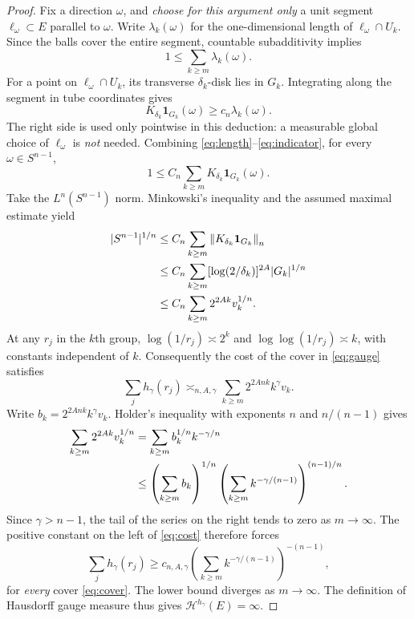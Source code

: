 \documentclass[11pt,a4paper]{article}
\numberwithin{equation}{section}
\theoremstyle{definition}
\theoremstyle{remark}
\newcommand{\one}{\mathbf 1}
\newcommand{\Hs}{\mathcal H}
\newcommand{\Sph}{S^{n-1}}
\begin{document}
\begin{proof}
Fix a direction $\omega$, and \emph{choose for this argument only}
a unit segment $\ell_\omega\subset E$ parallel to $\omega$.
Write $\lambda_k(\omega)$ for the one-dimensional length of
$\ell_\omega\cap U_k$. Since the balls cover the entire segment,
countable subadditivity implies
\begin{equation}\label{eq:length}
 1\le\sum_{k\ge m}\lambda_k(\omega).
\end{equation}
For a point on $\ell_\omega\cap U_k$, its transverse
$\delta_k$-disk lies in $G_k$. Integrating along the segment in
tube coordinates gives
\begin{equation}\label{eq:indicator}
 K_{\delta_k}\one_{G_k}(\omega)
          \ge c_n\lambda_k(\omega).
\end{equation}
The right side is used only pointwise in this deduction: a
measurable global choice of $\ell_\omega$ is \emph{not} needed.
Combining \eqref{eq:length}--\eqref{eq:indicator}, for every
$\omega\in\Sph$,
\begin{equation}\label{eq:pointwise}
 1\le C_n\sum_{k\ge m}K_{\delta_k}\one_{G_k}(\omega).
\end{equation}
Take the $L^n(\Sph)$ norm. Minkowski's inequality and the assumed
maximal estimate yield
\begin{align}
 |\Sph|^{1/n}
 &\le C_n\sum_{k\ge m}\left\|K_{\delta_k}
                                      \one_{G_k}\right\|_n\notag\\
 &\le C_n\sum_{k\ge m}
      [\log(2/\delta_k)]^{2A}|G_k|^{1/n}\notag\\
 &\le C_n\sum_{k\ge m}2^{2Ak}v_k^{1/n}.
 \label{eq:cost}
\end{align}
At any $r_j$ in the $k$th group,
$\log(1/r_j)\asymp2^k$ and
$\log\log(1/r_j)\asymp k$, with constants independent of $k$.
Consequently the cost of the cover in \eqref{eq:gauge} satisfies
\begin{equation}\label{eq:costcompare}
 \sum_jh_\gamma(r_j)
     \asymp_{n,A,\gamma}\sum_{k\ge m}
                             2^{2Ank}k^{\gamma}v_k.
\end{equation}
Write $b_k=2^{2Ank}k^\gamma v_k$. Holder's inequality with
exponents $n$ and $n/(n-1)$ gives
\begin{align}
 \sum_{k\ge m}2^{2Ak}v_k^{1/n}
 &=\sum_{k\ge m}b_k^{1/n}k^{-\gamma/n}\notag\\
 &\le\left(\sum_{k\ge m}b_k\right)^{1/n}
       \left(\sum_{k\ge m}k^{-\gamma/(n-1)}\right)^{(n-1)/n}.
 \label{eq:holder}
\end{align}
Since $\gamma>n-1$, the tail of the series on the right tends to
zero as $m\to\infty$. The positive constant on the left of
\eqref{eq:cost} therefore forces
\begin{equation}\label{eq:lowercost}
 \sum_jh_\gamma(r_j)
 \ge c_{n,A,\gamma}
       \left(\sum_{k\ge m}k^{-\gamma/(n-1)}\right)^{-(n-1)},
\end{equation}
for \emph{every} cover \eqref{eq:cover}. The lower bound diverges
as $m\to\infty$. The definition of Hausdorff gauge measure thus
gives $\Hs^{h_\gamma}(E)=\infty$.


\end{proof}
\end{document}
